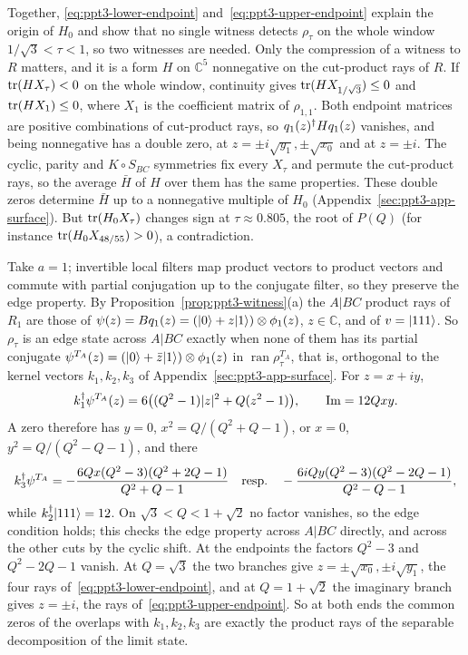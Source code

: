 \begin{remark}
Together, \eqref{eq:ppt3-lower-endpoint} and~\eqref{eq:ppt3-upper-endpoint} explain the origin of $H_0$ and show that no
single witness detects $\rho_\tau$ on the whole window $1/\sqrt3<\tau<1$, so two witnesses are needed. Only the compression of a
witness to $R$ matters, and it is a form $H$ on $\mathbb C^5$ nonnegative on the cut-product rays of $R$. If $\operatorname{tr}(HX_\tau)<0$
on the whole window, continuity gives $\operatorname{tr}(HX_{1/\sqrt3})\le0$ and $\operatorname{tr}(HX_1)\le0$, where $X_1$ is the coefficient matrix of
$\rho_{1,1}$. Both endpoint matrices are positive
combinations of cut-product rays, so $q_1(z)^{\dagger} Hq_1(z)$ vanishes, and being nonnegative has a double zero, at
$z=\pm i\sqrt{y_1},\pm\sqrt{x_0}$ and at $z=\pm i$. The cyclic, parity and $K\circ S_{BC}$ symmetries fix every $X_\tau$ and
permute the cut-product rays, so the average $\bar H$ of $H$ over them has the same properties. These double zeros determine
$\bar H$ up to a nonnegative multiple of $H_0$ (Appendix~\ref{sec:ppt3-app-surface}). But $\operatorname{tr}(H_0X_\tau)$ changes sign at
$\tau\approx0.805$, the root of $P(Q)$ (for instance $\operatorname{tr}(H_0X_{48/55})>0$), a contradiction.
\end{remark}

\begin{remark}\label{rem:ppt3-edge-overlap}
Take $a=1$; invertible local filters map product vectors to product vectors and commute with partial conjugation up to the conjugate
filter, so they preserve the edge property. By Proposition~\ref{prop:ppt3-witness}(a) the $A|BC$ product rays of $R_1$ are those of
$\psi(z)=Bq_1(z)=(\lvert0\rangle+z\lvert1\rangle)\otimes\phi_1(z)$, $z\in\mathbb C$, and of $v=\lvert111\rangle$. So $\rho_\tau$ is an edge state across $A|BC$ exactly when none of them has its partial conjugate
$\psi^{T_A}(z)=(\lvert0\rangle+\bar z\lvert1\rangle)\otimes\phi_1(z)$ in $\operatorname{ran}\rho_\tau^{T_A}$, that is, orthogonal to the kernel vectors $k_1,k_2,k_3$ of Appendix~\ref{sec:ppt3-app-surface}.
For $z=x+iy$,
\[
k_1^{\dagger}\psi^{T_A}(z)=6\bigl((Q^2-1)|z|^2+Q(z^2-1)\bigr),\qquad\operatorname{Im}=12Qxy .
\]
A zero therefore has $y=0$, $x^2=Q/(Q^2+Q-1)$, or $x=0$, $y^2=Q/(Q^2-Q-1)$, and there
\[
k_3^{\dagger}\psi^{T_A}=-\frac{6Qx(Q^2-3)(Q^2+2Q-1)}{Q^2+Q-1}\quad\text{resp.}\quad-\frac{6iQy(Q^2-3)(Q^2-2Q-1)}{Q^2-Q-1},
\]
while $k_2^{\dagger}\lvert111\rangle=12$. On $\sqrt3<Q<1+\sqrt2$ no factor vanishes, so the edge condition holds; this checks the edge property across $A|BC$ directly, and across the other cuts by
the cyclic shift. At the endpoints the factors $Q^2-3$ and $Q^2-2Q-1$ vanish. At $Q=\sqrt3$ the two branches give $z=\pm\sqrt{x_0},\pm i\sqrt{y_1}$, the four rays of~\eqref{eq:ppt3-lower-endpoint}, and at $Q=1+\sqrt2$
the imaginary branch gives $z=\pm i$, the rays of~\eqref{eq:ppt3-upper-endpoint}. So at both ends the common zeros of the overlaps with $k_1,k_2,k_3$ are exactly the product rays of the separable decomposition of the limit state.
\end{remark}

